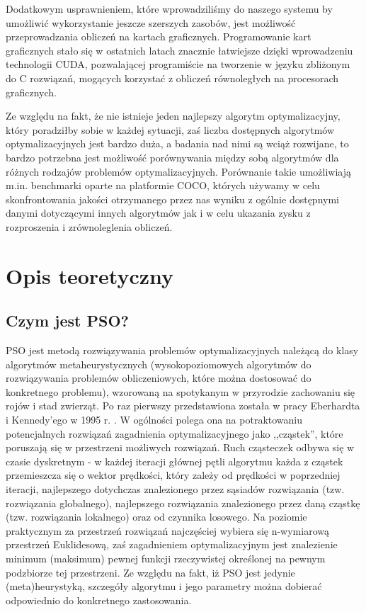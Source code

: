 \documentclass[12pt, twoside, openany, abstract=on]{report}
\theoremstyle{definition}
\begin{document}
Dodatkowym usprawnieniem, które wprowadziliśmy do naszego systemu by umożliwić wykorzystanie jeszcze szerszych zasobów, jest możliwość przeprowadzania obliczeń na kartach graficznych. Programowanie kart graficznych stało się w ostatnich latach znacznie łatwiejsze dzięki wprowadzeniu technologii CUDA, pozwalającej programiście na tworzenie w języku zbliżonym do C rozwiązań, mogących korzystać z obliczeń równoległych na procesorach graficznych.

Ze względu na fakt, że nie istnieje jeden najlepszy algorytm optymalizacyjny, który poradziłby sobie w każdej sytuacji, zaś liczba dostępnych algorytmów optymalizacyjnych jest bardzo duża, a badania nad nimi są wciąż rozwijane, to bardzo potrzebna jest możliwość porównywania między sobą algorytmów dla różnych rodzajów problemów optymalizacyjnych. Porównanie takie umożliwiają m.in. benchmarki oparte na platformie COCO, których używamy w celu skonfrontowania jakości otrzymanego przez nas wyniku z ogólnie dostępnymi danymi dotyczącymi innych algorytmów jak i w celu ukazania zysku z rozproszenia i zrównoleglenia obliczeń.


\chapter{Opis teoretyczny}

\section{Czym jest PSO?}

PSO jest metodą rozwiązywania problemów optymalizacyjnych należącą do klasy algorytmów metaheurystycznych (wysokopoziomowych algorytmów do rozwiązywania problemów obliczeniowych, które można dostosować do konkretnego problemu), wzorowaną na spotykanym w przyrodzie zachowaniu się rojów i stad zwierząt. Po raz pierwszy przedstawiona została w pracy Eberhardta  i Kennedy’ego w 1995 r. \cite{Pso}. W ogólności polega ona na potraktowaniu potencjalnych rozwiązań zagadnienia optymalizacyjnego jako ,,cząstek'', które poruszają się w przestrzeni możliwych rozwiązań. Ruch cząsteczek odbywa się w czasie dyskretnym - w każdej iteracji głównej pętli algorytmu każda z cząstek przemieszcza się o wektor prędkości, który zależy od prędkości w poprzedniej iteracji, najlepszego dotychczas znalezionego przez sąsiadów rozwiązania (tzw. rozwiązania globalnego), najlepszego rozwiązania znalezionego przez daną cząstkę (tzw. rozwiązania lokalnego) oraz od czynnika losowego. Na poziomie praktycznym za przestrzeń rozwiązań najczęściej wybiera się n-wymiarową przestrzeń Euklidesową, zaś zagadnieniem optymalizacyjnym jest znalezienie minimum (maksimum) pewnej funkcji rzeczywistej określonej na pewnym podzbiorze tej przestrzeni. Ze względu na fakt, iż PSO jest jedynie (meta)heurystyką, szczegóły algorytmu i jego parametry można dobierać odpowiednio do konkretnego zastosowania.
\end{document}

